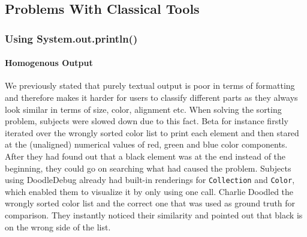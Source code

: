 \documentclass[english]{acm_proc_article-sp}
\begin{document}
\subsection{Problems With Classical Tools}

\subsubsection{Using System.out.println()}
\paragraph{Homogenous Output}
We previously stated that purely textual output is poor in terms of formatting and therefore makes it harder for users to classify different parts as they always look similar in terms of size, color, alignment etc.
When solving the sorting problem, subjects were slowed down due to this fact. Beta for instance firstly iterated over the wrongly sorted color list to print each element and then stared at the (unaligned) numerical values of red, green and blue color components. After they had found out that a black element was at the end instead of the beginning, they could go on searching what had caused the problem. Subjects using DoodleDebug already had built-in renderings for \verb.Collection. and \verb.Color., which enabled them to visualize it by only using one call. Charlie Doodled the wrongly sorted color list and the correct one that was used as ground truth for comparison. They instantly noticed their similarity and pointed out that black is on the wrong side of the list.
\end{document}
